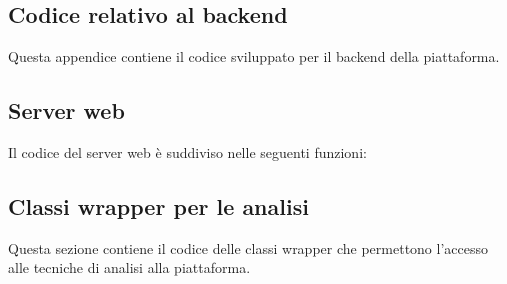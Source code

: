 \documentclass[12pt, a4paper, oneside]{report}
\begin{document}
    \begin{appendices}
        \chapter{Codice relativo al backend}
        Questa appendice contiene il codice sviluppato per il backend della piattaforma.
        \section{Server web}
        Il codice del server web è suddiviso nelle seguenti funzioni:
        


        

        

        \newpage
        

        

        

        

        \section{Classi wrapper per le analisi}
        Questa sezione contiene il codice delle classi wrapper che permettono l'accesso alle tecniche di analisi
        alla piattaforma.

\end{appendices}
\end{document}
